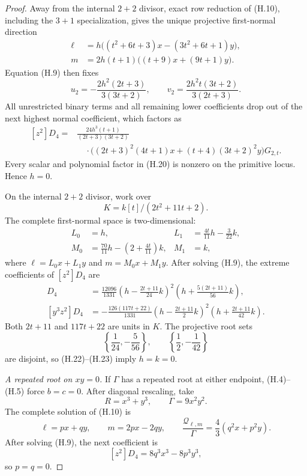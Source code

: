 \begin{proof}
Away from the internal \(2+2\) divisor, exact row reduction of (H.10),
including the \(3+1\) specialization, gives the unique projective
first-normal direction
\begin{equation}
\begin{aligned}
 \ell&=h\bigl((t^2+6t+3)x-(3t^2+6t+1)y\bigr),\\
 m&=2h(t+1)\bigl((t+9)x+(9t+1)y\bigr).
\end{aligned}
\tag{H.19}
\end{equation}
Equation (H.9) then fixes
\[
 u_2=-\frac{2h^2(2t+3)}{3(3t+2)},
 \qquad
 v_2=\frac{2h^2t(3t+2)}{3(2t+3)}.
\]
All unrestricted binary terms and all remaining lower coefficients drop out
of the next highest normal coefficient, which factors as
\begin{equation}
\begin{aligned}
 [z^2]D_4={}&
 \frac{24h^3(t+1)}{(2t+3)(3t+2)}\\
 &\quad\cdot
 \bigl((2t+3)^2(4t+1)x+(t+4)(3t+2)^2y\bigr)G_{2,t}.
\end{aligned}
\tag{H.20}
\end{equation}
Every scalar and polynomial factor in (H.20) is nonzero on the primitive
locus.  Hence \(h=0\).

On the internal \(2+2\) divisor, work over
\[
 K=k[t]/(2t^2+11t+2).
\]
The complete first-normal space is two-dimensional:
\begin{equation}
\begin{aligned}
 L_0&=h,&
 L_1&=\frac{4t}{11}h-\frac3{22}k,\\
 M_0&=\frac{70}{11}h-
       \left(2+\frac{4t}{11}\right)k,&
 M_1&=k,
\end{aligned}
\tag{H.21}
\end{equation}
where \(\ell=L_0x+L_1y\) and \(m=M_0x+M_1y\).  After solving (H.9), the
extreme coefficients of \([z^2]D_4\) are
\begin{align}
 [x^3z^2]D_4
 &=\frac{12096}{1331}
 \left(h-\frac{2t+11}{24}k\right)^2
 \left(h+\frac{5(2t+11)}{56}k\right),       \tag{H.22}\\
 [y^3z^2]D_4
 &=-\frac{126(117t+22)}{1331}
 \left(h-\frac{2t+11}{2}k\right)^2
 \left(h+\frac{2t+11}{42}k\right).          \tag{H.23}
\end{align}
Both \(2t+11\) and \(117t+22\) are units in \(K\).  The projective root
sets
\[
 \left\{\frac1{24},-\frac5{56}\right\},
 \qquad
 \left\{\frac12,-\frac1{42}\right\}
\]
are disjoint, so (H.22)--(H.23) imply \(h=k=0\).

\smallskip
\noindent
\emph{A repeated root on \(xy=0\).}
If \(\Gamma\) has a repeated root at either endpoint, (H.4)--(H.5) force
\(b=c=0\).  After diagonal rescaling, take
\[
 R=x^3+y^3,
 \qquad
 \Gamma=9x^2y^2.
\]
The complete solution of (H.10) is
\[
 \ell=px+qy,
 \qquad
 m=2px-2qy,
 \qquad
 \frac{\mathcal Q_{\ell,m}}{\Gamma}
 =\frac43(q^2x+p^2y).
\]
After solving (H.9), the next coefficient is
\[
 [z^2]D_4=8q^3x^3-8p^3y^3,
\]
so \(p=q=0\).


\end{proof}
